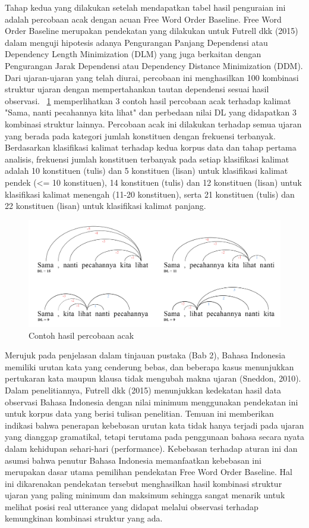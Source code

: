 Tahap kedua yang dilakukan setelah mendapatkan tabel hasil penguraian ini adalah percobaan acak dengan acuan Free Word Order Baseline. Free Word Order Baseline merupakan pendekatan yang dilakukan untuk Futrell dkk (2015) dalam menguji hipotesis adanya Pengurangan Panjang Dependensi atau Dependency Length Minimization (DLM) yang juga berkaitan dengan Pengurangan Jarak Dependensi atau Dependency Distance Minimization (DDM). Dari ujaran-ujaran yang telah diurai, percobaan ini menghasilkan 100 kombinasi struktur ujaran dengan mempertahankan tautan dependensi sesuai hasil observasi. \pic~\ref{fig:percobaan_acak} memperlihatkan 3 contoh hasil percobaan acak terhadap kalimat "Sama, nanti pecahannya kita lihat" dan perbedaan nilai DL yang didapatkan 3 kombinasi struktur lainnya. Percobaan acak ini dilakukan terhadap semua ujaran yang berada pada kategori jumlah konstituen dengan frekuensi terbanyak. Berdasarkan klasifikasi kalimat terhadap kedua korpus data dan tahap pertama analisis, frekuensi jumlah konstituen terbanyak pada setiap klasifikasi kalimat adalah 10 konstituen (tulis) dan 5 konstituen (lisan) untuk klasifikasi kalimat pendek (\textless= 10 konstituen), 14 konstituen (tulis) dan 12 konstituen (lisan) untuk klasifikasi kalimat menengah (11-20 konstituen), serta 21 konstituen (tulis) dan 22 konstituen (lisan) untuk klasifikasi kalimat panjang. 

\begin{figure}
	\centering \includegraphics[width=0.8
	\textwidth] {pics/percobaan_acak.jpg} 
	\caption{Contoh hasil percobaan acak} 
\label{fig:percobaan_acak} 
\end{figure}

Merujuk pada penjelasan dalam tinjauan pustaka (Bab 2), Bahasa Indonesia memiliki urutan kata yang cenderung bebas, dan beberapa kasus menunjukkan pertukaran kata maupun klausa tidak mengubah makna ujaran (Sneddon, 2010). Dalam penelitiannya, Futrell dkk (2015) menunjukkan kedekatan hasil data observasi Bahasa Indonesia dengan nilai minimum menggunakan pendekatan ini untuk korpus data yang berisi tulisan penelitian. Temuan ini memberikan indikasi bahwa penerapan kebebasan urutan kata tidak hanya terjadi pada ujaran yang dianggap gramatikal, tetapi terutama pada penggunaan bahasa secara nyata dalam kehidupan sehari-hari (performance). Kebebasan terhadap aturan ini dan asumsi bahwa penutur Bahasa Indonesia memanfaatkan kebebasan ini merupakan dasar utama pemilihan pendekatan Free Word Order Baseline. Hal ini dikarenakan pendekatan tersebut menghasilkan hasil kombinasi struktur ujaran yang paling minimum dan maksimum sehingga sangat menarik untuk melihat posisi real utterance yang didapat melalui observasi terhadap kemungkinan kombinasi struktur yang ada. 

